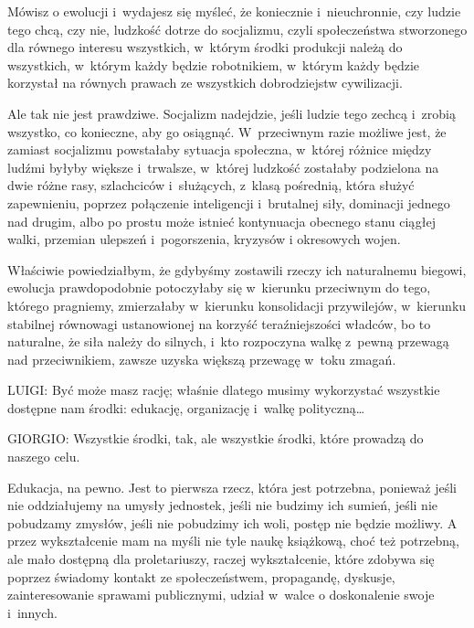 \documentclass[oneside,polish,11pt,sfheadings]{mwbk}
\begin{document}
 
Mówisz o ewolucji i~wydajesz się myśleć, że koniecznie i~nieuchronnie, czy ludzie tego chcą, czy nie, ludzkość dotrze do
socjalizmu, czyli społeczeństwa stworzonego dla równego interesu wszystkich, w~którym środki produkcji należą do
wszystkich, w~którym każdy będzie robotnikiem, w~którym każdy będzie korzystał na równych prawach ze wszystkich
dobrodziejstw cywilizacji. 

 
Ale tak nie jest prawdziwe. Socjalizm nadejdzie, jeśli ludzie tego zechcą i~zrobią wszystko, co konieczne, aby go
osiągnąć. W~przeciwnym razie możliwe jest, że zamiast socjalizmu powstałaby sytuacja społeczna, w~której różnice między
ludźmi byłyby większe i~trwalsze, w~której ludzkość zostałaby podzielona na dwie różne rasy, szlachciców i~służących, z~klasą pośrednią, która służyć zapewnieniu, poprzez połączenie inteligencji i~brutalnej siły, dominacji jednego nad
drugim, albo po prostu może istnieć kontynuacja obecnego stanu ciągłej walki, przemian ulepszeń i~pogorszenia, kryzysów
i okresowych wojen. 

 
Właściwie powiedziałbym, że gdybyśmy zostawili rzeczy ich naturalnemu biegowi, ewolucja prawdopodobnie potoczyłaby się w~kierunku przeciwnym do tego, którego pragniemy, zmierzałaby w~kierunku konsolidacji przywilejów, w~kierunku stabilnej
równowagi ustanowionej na korzyść teraźniejszości władców, bo to naturalne, że siła należy do silnych, i~kto rozpoczyna
walkę z~pewną przewagą nad przeciwnikiem, zawsze uzyska większą przewagę w~toku zmagań. 




 
\noindent LUIGI: Być może masz rację; właśnie dlatego musimy wykorzystać wszystkie dostępne nam środki: edukację, organizację i~walkę polityczną\ldots 




 
\noindent GIORGIO: Wszystkie środki, tak, ale wszystkie środki, które prowadzą do naszego celu. 

 
Edukacja, na pewno. Jest to pierwsza rzecz, która jest potrzebna, ponieważ jeśli nie oddziałujemy na umysły jednostek,
jeśli nie budzimy ich sumień, jeśli nie pobudzamy zmysłów, jeśli nie pobudzimy ich woli, postęp nie będzie możliwy. A
przez wykształcenie mam na myśli nie tyle naukę książkową, choć też potrzebną, ale mało dostępną dla proletariuszy,
raczej wykształcenie, które zdobywa się poprzez świadomy kontakt ze społeczeństwem, propagandę, dyskusje,
zainteresowanie sprawami publicznymi, udział w~walce o doskonalenie swoje i~innych. 
\end{document}
